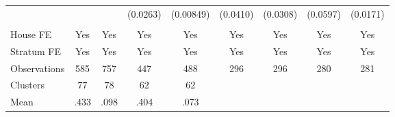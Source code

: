 {\begin{tabular}{l*{8}{c}}
                &         &         & (0.0263)&(0.00849)& (0.0410)& (0.0308)& (0.0597)& (0.0171)\\
                &         &         &         &         &         &         &         &         \\
House FE        &      Yes&      Yes&      Yes&      Yes&      Yes&      Yes&      Yes&      Yes\\
Stratum FE      &      Yes&      Yes&      Yes&      Yes&      Yes&      Yes&      Yes&      Yes\\
\midrule
Observations    &      585&      757&      447&      488&      296&      296&      280&      281\\
Clusters        &       77&       78&       62&       62&         &         &         &         \\
Mean            &     .433&     .098&     .404&     .073&         &         &         &         \\
\bottomrule
\end{tabular}
}
